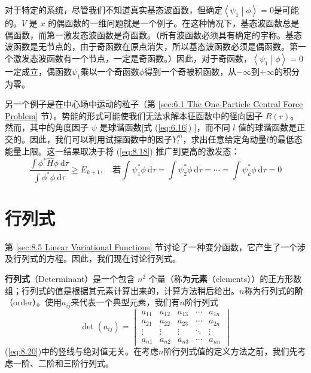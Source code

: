     对于特定的系统，尽管我们不知道真实基态波函数，但确定$\left\langle \psi_1 \middle| \phi \right\rangle = 0$是可能的。$V$ 是 $x$ 的偶函数的一维问题就是一个例子。在这种情况下，基态波函数总是偶函数，而第一激发态波函数是奇函数。（所有波函数必须具有确定的宇称。基态波函数是无节点的，由于奇函数在原点消失，所以基态波函数必须是偶函数。第一个激发态波函数有一个节点，一定是奇函数。）因此，对于奇函数，$\left\langle \psi_1 \middle| \phi \right\rangle = 0$一定成立，偶函数$\psi_1$乘以一个奇函数$\phi$得到一个奇被积函数，从$-\infty$到$+\infty$的积分为零。

    另一个例子是在中心场中运动的粒子（第 \ref{sec:6.1 The One-Particle Central Force Problem} 节）。势能的形式可能使我们无法求解本征函数中的径向因子 $R(r)$。然而，其中的角度因子 $\psi$ 是球谐函数[式 (\ref{eq:6.16}) ]，而不同 $l$ 值的球谐函数是正交的。因此，我们可以利用试探函数中的因子$Y_l^m$，求出任意给定角动量$l$的最低态能量上限。这一结果取决于将 (\ref{eq:8.18}) 推广到更高的激发态：
    \begin{equation}
        \frac{\int \phi^{\ast} \hat{H}\phi \:\mathrm{d}\tau}{\int \phi^{\ast} \phi \:\mathrm{d}\tau} \geq E_{k+1}, \quad \text{若} \int \psi_1^{\ast} \phi \: \mathrm{d}\tau = \int \psi_2^{\ast} \phi \:\mathrm{d}\tau = \cdots = \int \psi_k^{\ast} \phi \:\mathrm{d}\tau = 0
        \label{eq:8.19}
    \end{equation}

\section{行列式}
\label{sec:8.3 Determinants}
    第 \ref{sec:8.5 Linear Variational Functions} 节讨论了一种变分函数，它产生了一个涉及行列式的方程。因此，我们现在讨论行列式。
     
    \textbf{行列式}（Determinant）是一个包含 $n^2$ 个量（称为\textbf{元素}（elements））的正方形数组；行列式的值是根据其元素计算出来的，计算方法稍后给出。$n$称为行列式的\textbf{阶}（order）。使用$a_{ij}$来代表一个典型元素，我们有$n$阶行列式
    \begin{equation}
            \det\left(a_{ij}\right) = \begin{vmatrix}
                a_{11} & a_{12} & a_{13} & \cdots & a_{1n} \\
                a_{21} & a_{22} & a_{23} & \cdots & a_{2n} \\
                \vdots & \vdots & \vdots & \ddots & \vdots \\
                a_{n1} & a_{n2} & a_{n3} & \cdots & a_{nn}
            \end{vmatrix}
            \label{eq:8.20}
    \end{equation}
    (\ref{eq:8.20})中的竖线与绝对值无关。在考虑$n$阶行列式值的定义方法之前，我们先考虑一阶、二阶和三阶行列式。

